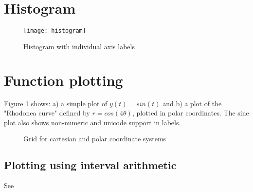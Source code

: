 \section{Histogram}
\begin{figure}[H]
\centering
\texttt{[image: histogram]}
\caption{Histogram with individual axis labels}
\end{figure}
\section{Function plotting}

Figure \ref{plots} shows: a) a simple plot of $y(t) = sin(t)$ and b) a plot of the "Rhodonea curve" defined by $r = cos(4\theta)$, plotted in polar coordinates. The sine plot also shows non-numeric and unicode support in labels.

\begin{figure}[H]
	\centering
	\caption{Grid for cartesian and polar coordinate systems}
	\label{plots}
\end{figure}

\subsection{Plotting using interval arithmetic}
See \cite{shou05, fateman92, martin02}
